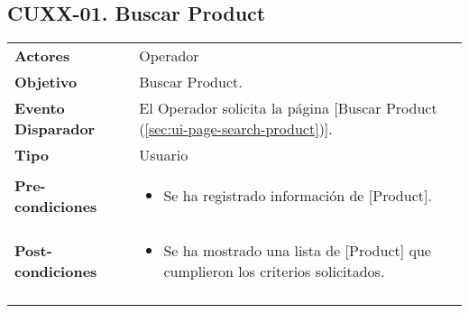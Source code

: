 	\subsection{CUXX-01. Buscar Product} \label{sec:cu-search-Product}
	
	\begin{tabular}{ p{3.5cm} p{11.5cm} }
		\textbf{Actores} & Operador\\
		\textbf{Objetivo} & Buscar Product.\\
		\textbf{Evento Disparador} & El Operador solicita la p\'agina [Buscar Product (\ref{sec:ui-page-search-product})].\\
		\textbf{Tipo} & Usuario\\
		\textbf{Pre-condiciones} &
			\begin{minipage}[t]{0.6\textwidth}
			\begin{itemize}[noitemsep,nolistsep]
			\setlength{\itemindent}{-.5cm}
				\item Se ha registrado informaci\'on de [Product].
			\end{itemize}
			\end{minipage} \\
		\textbf{Post-condiciones} &
			\begin{minipage}[t]{0.6\textwidth}
			\begin{itemize}[noitemsep,nolistsep]
			\setlength{\itemindent}{-.5cm}
				\item Se ha mostrado una lista de [Product] que cumplieron los criterios solicitados.
			\end{itemize}
			\end{minipage} \\
		\\
	\end{tabular}
	
